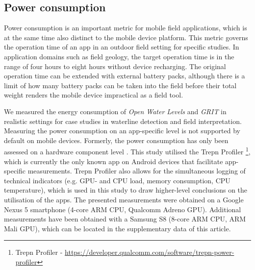 \documentclass[review]{elsarticle}
\begin{document}
%

\subsection{Power consumption}
\label{sec:technology:power}

Power consumption is an important metric for mobile field applications, which is at the same time also distinct to the mobile device platform. This metric governs the operation time of an app in an outdoor field setting for specific studies. In application domains such as field geology, the target operation time is in the range of four hours to eight hours without device recharging. The original operation time can be extended with external battery packs, although there is a limit of how many battery packs can be taken into the field before their total weight renders the mobile device impractical as a field tool.

We measured the energy consumption of \textit{Open Water Levels} and \textit{\gls{GRIT}} in realistic settings for case studies in waterline detection and field interpretation. Measuring the power consumption on an app-specific level is not supported by default on mobile devices. Formerly, the power consumption has only been assessed on a hardware component level \cite{Carroll2010}. This study utilised the Trepn Profiler \footnote{Trepn Profiler - \url{https://developer.qualcomm.com/software/trepn-power-profiler}}, which is currently the only known app on Android devices that facilitate app-specific measurements. Trepn Profiler also allows for the simultaneous logging of technical indicators (e.g. \gls{GPU}- and \gls{CPU} load, memory consumption, \gls{CPU} temperature), which is used in this study to draw higher-level conclusions on the utilisation of the apps. The presented measurements were obtained on a Google Nexus 5 smartphone (4-core ARM \gls{CPU}, Qualcomm Adreno \gls{GPU}). Additional measurements have been obtained with a Samsung S8 (8-core ARM \gls{CPU}, ARM Mali \gls{GPU}), which can be located in the supplementary data of this article.
\end{document}
